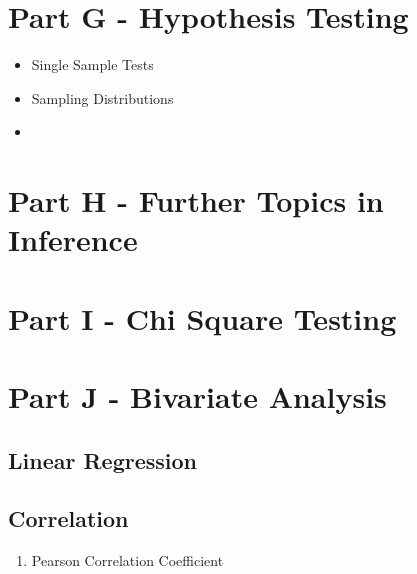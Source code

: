 \documentclass[]{article}
\begin{document}
\section{Part G - Hypothesis Testing}

\begin{itemize}
\item Single Sample Tests
\item Sampling Distributions
\item 
\end{itemize}

\section{Part H - Further Topics in Inference}
\section{Part I - Chi Square Testing}
\section{Part J - Bivariate Analysis}
\subsection{Linear Regression}
\subsection{Correlation}
\begin{enumerate}
\item Pearson Correlation Coefficient
\end{enumerate}
\end{document}
